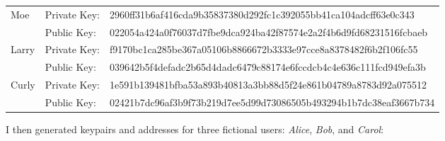 \documentclass{report}
\begin{document}
			\bgroup
			\small
			\def\arraystretch{1.5}
			\begin{tabular}{|l|l|l|}
			\hline
				\multirow{2}{*}{Moe} & Private Key: & 2960ff31b6af416cda9b35837380d292fc1c392055bb41ca104adcff63e0c343 \\ \cline{2-3} 
		                   & Public Key:  & 022054a424a0f76037d7fbe9dca924ba42f87574e2a2f4b6d9fd68231516fcbaeb \\ \hline
				\multirow{2}{*}{Larry} & Private Key: & f9170bc1ca285be367a05106b8866672b3333e97cce8a8378482f6b2f106fc55 \\ \cline{2-3} 
		                   & Public Key:  & 039642b5f4defadc2b65d4dadc6479c88174e6fccdcb4c4e636c111fcd949efa3b \\ \hline
				\multirow{2}{*}{Curly} & Private Key: & 1e591b139481bfba53a893b40813a3bb88d5f24e861b04789a8783d92a075512 \\ \cline{2-3} 
		                   & Public Key:  & 02421b7dc96af3b9f73b219d7ee5d99d73086505b493294b1b7dc38eaf3667b734 \\ \hline
			\end{tabular}
			\egroup
			\bigbreak
			\normalsize
			I then generated keypairs and addresses for three fictional users: \textit{Alice}, \textit{Bob}, and \textit{Carol}:\\
			
\end{document}

